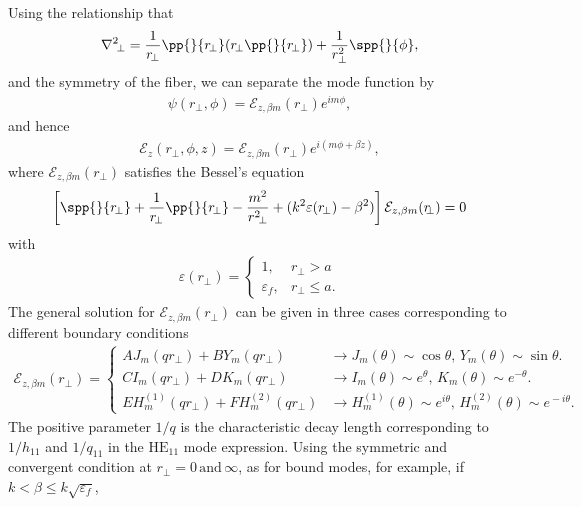 \documentclass[]{report}
\begin{document}
Using the relationship that
\begin{align}
\nabla^2 \!_\perp = \frac{1}{r_{\!\perp}}\pp{}{r\!_\perp}\! \left(r\!_\perp \pp{}{r\!_\perp} \right) + 
\frac{1}{r_\perp^2} \spp{}{\phi},
\end{align}
and the symmetry of the fiber,  we can  separate the mode function by
\begin{align}
\psi(r\!_\perp,\phi)=\mathcal{E}_{z,\beta m}(r\!_\perp)e^{im\phi},
\end{align} 
and hence
\begin{align}
\mathcal{E}_z(r\!_\perp,\phi,z) = \mathcal{E}_{z,\beta m}(r\!_\perp)e^{i(m\phi+\beta z)},
\end{align}
where $ \mathcal{E}_{z,\beta m}(r\!_\perp) $ satisfies the Bessel's equation
\begin{align}
\left[ \spp{}{r\!_\perp}+ \frac{1}{r_{\!\perp}}\pp{}{r\!_\perp}- 
\frac{m^2}{r^2\!_\perp} + (k^2\varepsilon(r\!_\perp)-\beta^2) \right] 
\mathcal{E}_{z,\beta m}(r\!\!_\perp)=0
\end{align}
with 
\begin{align}
\varepsilon(r\!\!_\perp) = 
\begin{cases}
1, & r\!_\perp>a\\
\varepsilon_f, & r\!_\perp\leq a.
\end{cases}
\end{align}
The general solution for $ \mathcal{E}_{z,\beta m}(r\!\!_\perp) $ can be given in three cases 
corresponding to different 
boundary conditions
\begin{align}
\mathcal{E}_{z,\beta m}(r\!\!_\perp) = \begin{cases}
AJ_m(qr\!\!_\perp) + B Y_m(qr\!_\perp)&\rightarrow J_m(\theta)\sim \cos\theta,\, Y_m(\theta)\sim 
\sin\theta.\\
CI_m(qr\!_\perp) + DK_m(qr\!_\perp) & \rightarrow I_m(\theta) \sim e^\theta,\, K_m(\theta) \sim 
e^{-\theta}.\\
EH_m^{(\!1\!)}(qr\!_\perp) \!+\! FH_m^{(\!2\!)}(qr\!_\perp ) & \rightarrow H_m^{(\!1\!)} (\theta) \! \sim \! 
e^{i\theta},\, 
H_m^{(\!2\!)}(\theta)\!\sim\! e^{\!-i\theta}.
\end{cases}
\end{align}
The positive parameter $ 1/q $ is the characteristic decay length corresponding to $ 1/h_{11} $ and $ 
1/q_{11} $ 
in the $\text{HE}_{11}$ mode expression. Using the symmetric and convergent condition at $ 
r\!_\perp=0\,\text{and}\, \infty $, as for bound modes, for example, if $k< \beta\leq 
k\sqrt{\varepsilon_f}$,
\end{document}
